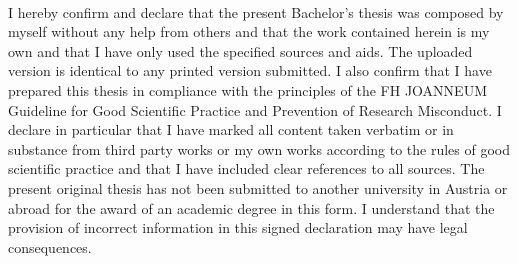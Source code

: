 %

\emptydoublepage \thispagestyle{empty} \vspace*{1cm}

{\hfill\fontfamily{\sfdefault}\bfseries\fontsize{16}{16}\selectfont{Obligatory declaration}}\vspace*{1cm}\\
%
I hereby confirm and declare that the present Bachelor's thesis
was composed by myself without any help from others and that the work contained herein is my own and that I have only used the specified sources and aids. The uploaded version is identical to any printed version submitted.\p
I also confirm that I have prepared this thesis in compliance with the principles of the FH JOANNEUM Guideline for Good Scientific Practice and Prevention of Research Misconduct.\p
I declare in particular that I have marked all content taken verbatim or in substance from third party works or my own works according to the rules of good scientific practice and that I have included clear references to all sources.\p
The present original thesis has not been submitted to another university in Austria or abroad for the award of an academic degree in this form.\p
I understand that the provision of incorrect information in this signed declaration may have legal consequences.
%
%
